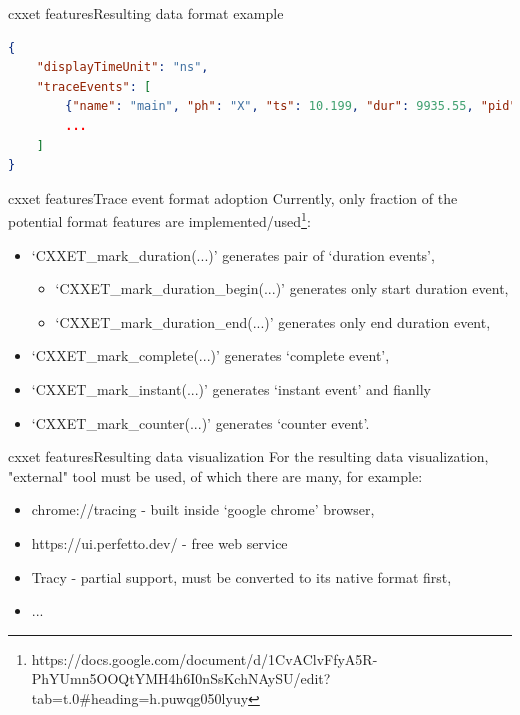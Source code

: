 \documentclass[aspectratio=169]{beamer}
\begin{document}
\begin{frame}[fragile]{cxxet features}{Resulting data format example}
    \begin{lstlisting}[language=json]
{
    "displayTimeUnit": "ns",
    "traceEvents": [
        {"name": "main", "ph": "X", "ts": 10.199, "dur": 9935.55, "pid": 220013, "tid": 220013},
        ...
    ]
}
    \end{lstlisting}

\end{frame}

\begin{frame}{cxxet features}{Trace event format adoption}
    Currently, only fraction of the potential format features are implemented/used\footnote{https://docs.google.com/document/d/1CvAClvFfyA5R-PhYUmn5OOQtYMH4h6I0nSsKchNAySU/edit?tab=t.0\#heading=h.puwqg050lyuy}:

    \begin{itemize}
        \item `CXXET\_mark\_duration(...)' generates pair of `duration events',
        \begin{itemize}
            \item `CXXET\_mark\_duration\_begin(...)' generates only start duration event,
            \item `CXXET\_mark\_duration\_end(...)' generates only end duration event,
        \end{itemize}
        \item `CXXET\_mark\_complete(...)' generates `complete event',
        \item `CXXET\_mark\_instant(...)' generates `instant event' and fianlly
        \item `CXXET\_mark\_counter(...)' generates `counter event'.
    \end{itemize}

\end{frame}

\begin{frame}{cxxet features}{Resulting data visualization}
    For the resulting data visualization, "external" tool must be used, of which there are many, for example:

    \begin{itemize}
        \item chrome://tracing - built inside `google chrome' browser,
        \item https://ui.perfetto.dev/ - free web service
        \item Tracy - partial support, must be converted to its native format first,
        \item ...
    \end{itemize}

\end{frame}
\end{document}
